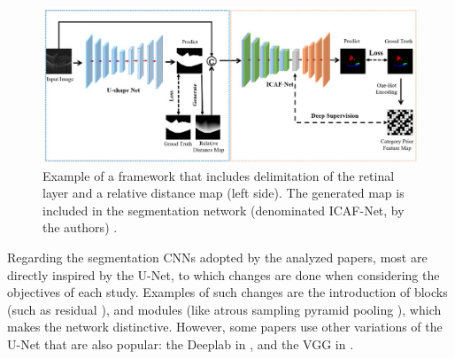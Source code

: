 \begin{figure}[!ht]
	\centering
	\includegraphics[width=1\linewidth]{figures/PreSegmentationAndFluidSegmentation.png}
	\caption{Example of a framework that includes delimitation of the retinal layer and a relative distance map (left side). The generated map is included in the segmentation network (denominated ICAF-Net, by the authors) \parencite{Tang2022}.}
	\label{fig:PreSegmentationAndFluidSegmentation}
\end{figure}
\par
Regarding the segmentation CNNs adopted by the analyzed papers, most are directly inspired by the U-Net, to which changes are done when considering the objectives of each study. Examples of such changes are the introduction of blocks (such as residual \parencite{Mantel2021, Zhang2023, Liu2024, Hassan2021b, Hassan2021a, Padilla2022}), and modules (like atrous sampling pyramid pooling \parencite{Hassan2021b, Hassan2021a, Hu2019, Sappa2021}), which makes the network distinctive. However, some papers use other variations of the U-Net that are also popular: the Deeplab \parencite{LChen2018} in \textcite{Hassan2021a, Li2023}, and the VGG \parencite{Simonyan2014} in \textcite{Padilla2022, Hassan2021b}.

